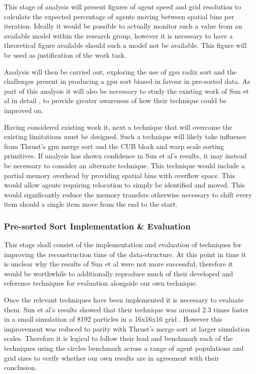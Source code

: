         This stage of analysis will present figures of agent speed and grid resolution to calculate the expected percentage of agents moving between spatial bins per iteration. Ideally it would be possible to actually monitor such a value from an available model within the research group, however it is necessary to have a theoretical figure available should such a model not be available. This figure will be used as justification of the work task.
        
        Analysis will then be carried out, exploring the use of \gls{gpu} radix sort and the challenges present in producing a \gls{gpu} sort biased in favour in pre-sorted data. As part of this analysis it will also be necessary to study the existing work of Sun et al in detail \cite{HY*15}, to provide greater awareness of how their technique could be improved on.

        Having considered existing work it, next a technique that will overcome the existing limitations must be designed. Such a technique will likely take influence from Thrust's \gls{gpu} merge sort and the CUB block and warp scale sorting primitives. If analysis has shown confidence in Sun et al's results, it may instead be necessary to consider an alternate technique. This technique would include a partial memory overhead by providing spatial bins with overflow space. This would allow agents requiring relocation to simply be identified and moved. This would significantly reduce the memory transfers otherwise necessary to shift every item should a single item move from the end to the start.
        
      \subsubsection*{Pre-sorted Sort Implementation \& Evaluation}
        This stage shall consist of the implementation and evaluation of techniques for improving the reconstruction time of the data-structure. At this point in time it is unclear why the results of Sun et al were not more successful, therefore it would be worthwhile to additionally reproduce much of their developed and reference techniques for evaluation alongside our own technique.
         
        Once the relevant techniques have been implemented it is necessary to evaluate them. Sun et al's results showed that their technique was around 2.3 times faster in a small simulation of 8192 particles in a 16x16x16 grid \cite{HY*15}. However this improvement was reduced to parity with Thrust's merge sort at larger simulation scales. Therefore it is logical to follow their lead and benchmark each of the techniques using the circles benchmark across a range of agent populations and grid sizes to verify whether our own results are in agreement with their conclusion. 
        
